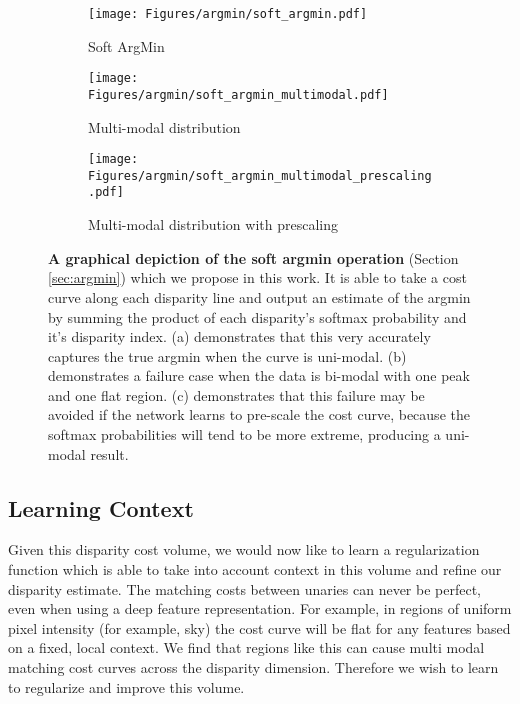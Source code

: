 \documentclass[10pt,twocolumn,letterpaper]{article}
\begin{document}
\begin{figure*}[t]
	\begin{center}
    		\begin{subfigure}[b]{0.32\linewidth}
			\texttt{[image: Figures/argmin/soft\_argmin.pdf]}
	        \caption{Soft ArgMin}
		\end{subfigure}
    		\begin{subfigure}[b]{0.32\linewidth}
			\texttt{[image: Figures/argmin/soft\_argmin\_multimodal.pdf]}
	        \caption{Multi-modal distribution}
		\end{subfigure}
    		\begin{subfigure}[b]{0.32\linewidth}
			\texttt{[image: Figures/argmin/soft\_argmin\_multimodal\_prescaling.pdf]}
	        \caption{Multi-modal distribution with prescaling}
		\end{subfigure}
	\end{center}
	\caption{\textbf{A graphical depiction of the soft argmin operation} (Section \ref{sec:argmin}) which we propose in this work. It is able to take a cost curve along each disparity line and output an estimate of the argmin by summing the product of each disparity's softmax probability and it's disparity index. (a) demonstrates that this very accurately captures the true argmin when the curve is uni-modal. (b) demonstrates a failure case when the data is bi-modal with one peak and one flat region. (c) demonstrates that this failure may be avoided if the network learns to pre-scale the cost curve, because the softmax probabilities will tend to be more extreme, producing a uni-modal result.}
	\label{fig:argmin}
\end{figure*}

\subsection{Learning Context}
\label{sec:regularise}

Given this disparity cost volume, we would now like to learn a regularization function which is able to take into account context in this volume and refine our disparity estimate. The matching costs between unaries can never be perfect, even when using a deep feature representation. For example, in regions of uniform pixel intensity (for example, sky) the cost curve will be flat for any features based on a fixed, local context.  We find that regions like this can cause multi modal matching cost curves across the disparity dimension. Therefore we wish to learn to regularize and improve this volume.
\end{document}
